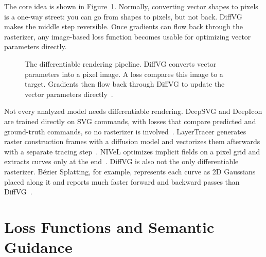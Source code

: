 The core idea is shown in Figure~\ref{fig:diffvg_pipeline}. 
Normally, converting vector shapes to pixels is a one-way 
street: you can go from shapes to pixels, but not back. 
DiffVG makes the middle step reversible. Once gradients 
can flow back through the rasterizer, any image-based loss 
function becomes usable for optimizing vector parameters 
directly.

\begin{figure}[htbp]
\centering
{}
\caption{The differentiable rendering pipeline. DiffVG 
converts vector parameters into a pixel image. A loss 
compares this image to a target. Gradients then flow 
back through DiffVG to update the vector parameters 
directly~\cite{liDifferentiableVectorGraphics2020a}.}
\label{fig:diffvg_pipeline}
\end{figure}

Not every analyzed model needs differentiable rendering. 
DeepSVG and DeepIcon are trained directly on SVG commands, with 
losses that compare predicted and ground-truth commands, so no 
rasterizer is involved~\cite{carlierDeepSVGHierarchicalGenerative2020, bingDeepIconHierarchicalNetwork2024}. 
LayerTracer generates raster construction frames with a diffusion 
model and vectorizes them afterwards with a separate tracing 
step~\cite{songLayerTracerCognitiveAlignedLayered2025}. NIVeL 
optimizes implicit fields on a pixel grid and extracts curves only 
at the end~\cite{thamizharasanNIVeLNeuralImplicit2024}. DiffVG is 
also not the only differentiable rasterizer. B\'{e}zier Splatting, 
for example, represents each curve as 2D Gaussians placed along it 
and reports much faster forward and backward passes than 
DiffVG~\cite{liuBezierSplattingFast2025}.

\section{Loss Functions and Semantic Guidance}

